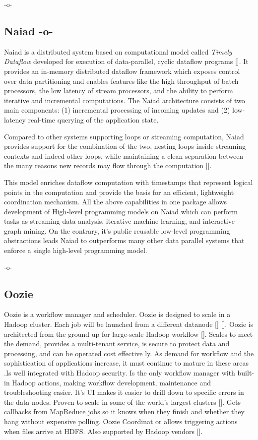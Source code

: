     -o-

    
\subsection{Naiad -o-}

Naiad is a distributed system based on computational model called
\textit{Timely Dataflow} developed for execution of data-parallel,
cyclic dataflow programs [\cite{paper-naiad}].  It provides an in-memory
distributed dataflow framework which exposes control over data
partitioning and enables features like the high throughput of batch
processors, the low latency of stream processors, and the ability to
perform iterative and incremental computations. The Naiad architecture
consists of two main components: (1) incremental processing of
incoming updates and (2) low-latency real-time querying of the
application state.
    
Compared to other systems supporting loops or streaming computation,
Naiad provides support for the combination of the two, nesting loops
inside streaming contexts and indeed other loops, while maintaining a
clean separation between the many reasons new records may flow through
the computation [\cite{www-naiad}].
    
This model enriches dataflow computation with timestamps that
represent logical points in the computation and provide the basis for
an efficient, lightweight coordination mechanism.  All the above
capabilities in one package allows development of High-level
programming models on Naiad which can perform tasks as streaming data
analysis, iterative machine learning, and interactive graph mining. On
the contrary, it's public reusable low-level programming abstractions
leads Naiad to outperforms many other data parallel systems that
enforce a single high-level programming model.

    -o-
    
\subsection{Oozie}

Oozie is a workflow manager and scheduler. Oozie is designed to scale
in a Hadoop cluster. Each job will be launched from a different
datanode [\cite{paper-Oozie}] [\cite{www-Oozie1}]. Oozie is architected
from the ground up for large-scale Hadoop workflow [\cite{www-Oozie2}].
Scales to meet the demand, provides a multi-tenant service, is secure
to protect data and processing, and can be operated cost effective
ly. As demand for workflow and the sophistication of applications
increase, it must continue to mature in these areas
\cite{paper-Oozie}.Is well integrated with Hadoop security. Is the
only workflow manager with built-in Hadoop actions, making workflow
development, maintenance and troubleshooting easier. It's UI makes it
easier to drill down to specific errors in the data nodes. Proven to
scale in some of the world's largest clusters [\cite{paper-Oozie}]. Gets
callbacks from MapReduce jobs so it knows when they finish and whether
they hang without expensive polling. Oozie Coordinat or allows
triggering actions when files arrive at HDFS. Also supported by Hadoop
vendors [\cite{paper-Oozie}].


